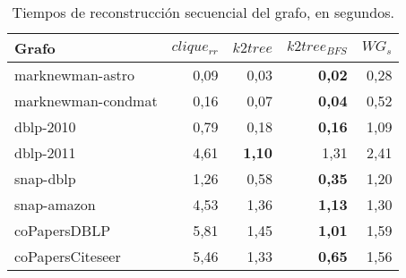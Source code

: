 \begin{table}
	\caption{Tiempos de reconstrucción secuencial del grafo, en segundos.}
	\label{table:timesSecuencial}
	\centering
	\begin{tabular}{l|r|r|r|r}
		\toprule
		Grafo & $clique_{rr}$ & $k2tree$ & $k2tree_{BFS}$ & $WG_{s}$ \\
        \midrule
        marknewman-astro & 0,09 & 0,03 & \textbf{0,02} & 0,28 \\
        marknewman-condmat & 0,16 & 0,07 & \textbf{0,04} & 0,52 \\
        dblp-2010 & 0,79 & 0,18 & \textbf{0,16} & 1,09 \\
        dblp-2011 & 4,61 & \textbf{1,10} & 1,31 & 2,41 \\
        snap-dblp & 1,26 & 0,58 & \textbf{0,35} & 1,20 \\
        snap-amazon & 4,53 & 1,36 & \textbf{1,13} & 1,30 \\
        coPapersDBLP & 5,81 & 1,45 & \textbf{1,01} & 1,59 \\
        coPapersCiteseer & 5,46 & 1,33 & \textbf{0,65} & 1,56 \\
        \bottomrule
	\end{tabular}
\end{table}

